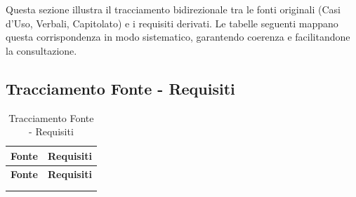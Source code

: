 \documentclass[12pt, a4paper]{article}
\begin{document}
Questa sezione illustra il tracciamento bidirezionale tra le fonti originali (Casi d'Uso, Verbali, Capitolato) e i requisiti derivati. Le tabelle seguenti mappano questa corrispondenza in modo sistematico, garantendo coerenza e facilitandone la consultazione.

\subsection{Tracciamento Fonte - Requisiti}

\begin{longtable}{|l|p{}|}
\hline
\textbf{Fonte} & \textbf{Requisiti} \\
\hline
\endfirsthead

\hline
\textbf{Fonte} & \textbf{Requisiti} \\
\hline
\endhead

\hline
\endfoot

\hline
    \caption{Tracciamento Fonte - Requisiti}
    \label{tab:tracciamento_f-r}\\
\endlastfoot


\end{longtable}
\end{document}
